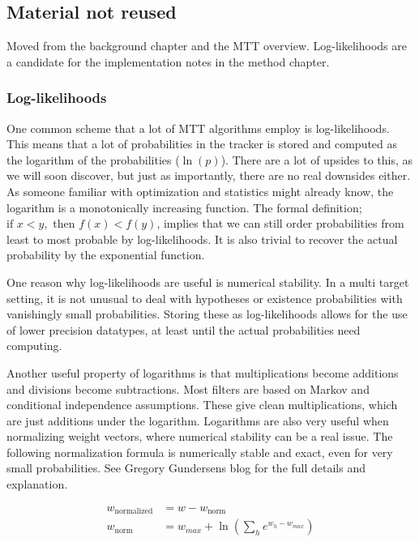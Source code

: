 \subsection{Material not reused}
\label{app:not-reused}

Moved from the background chapter and the MTT overview. Log-likelihoods are a candidate for the implementation notes in the method chapter.

\subsubsection{Log-likelihoods}
One common scheme that a lot of MTT algorithms employ is log-likelihoods. This means that a lot of probabilities in the tracker is stored and computed as the logarithm of the probabilities ($\ln(p)$). There are a lot of upsides to this, as we will soon discover, but just as importantly, there are no real downsides either. As someone familiar with optimization and statistics might already know, the logarithm is a monotonically increasing function. The formal definition; $\text{if } x < y, \text{ then } f(x) < f(y)$, implies that we can still order probabilities from least to most probable by log-likelihoods. It is also trivial to recover the actual probability by the exponential function.
\medskip

One reason why log-likelihoods are useful is numerical stability. In a multi target setting, it is not unusual to deal with hypotheses or existence probabilities with vanishingly small probabilities. Storing these as log-likelihoods allows for the use of lower precision datatypes, at least until the actual probabilities need computing. 
\medskip

Another useful property of logarithms is that multiplications become additions and divisions become subtractions. Most filters are based on Markov and conditional independence assumptions. These give clean multiplications, which are just additions under the logarithm. Logarithms are also very useful when normalizing weight vectors, where numerical stability can be a real issue. The following normalization formula is numerically stable and exact, even for very small probabilities. See Gregory Gundersens blog \cite{logsumexp} for the full details and explanation.

\begin{align*}
    w_{\text{normalized}} &= w - w_{\text{norm}} \\
    w_{\text{norm}} &= w_{max} + \ln \left( \sum_{h} e^{w_h - w_{max}} \right)
\end{align*}

